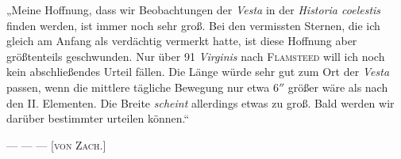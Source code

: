 \par\indent „Meine Hoffnung, dass wir Beobachtungen der \emph{Vesta} in der \emph{Historia coelestis} finden werden, ist immer noch sehr groß. Bei den vermissten Sternen, die ich gleich am Anfang als verdächtig vermerkt hatte, ist diese Hoffnung aber größtenteils geschwunden. Nur über 91 \emph{Virginis} nach
%
\textsc{Flamsteed} will ich noch kein abschließendes Urteil fällen. Die Länge würde sehr gut zum Ort der \emph{Vesta} passen, wenn die mittlere tägliche Bewegung nur etwa $6''$ größer wäre als nach den II. Elementen. Die Breite \emph{scheint} allerdings etwas zu groß. Bald werden wir darüber bestimmter urteilen können.“

--- --- ---
\hfill [\textsc{von Zach}.]
